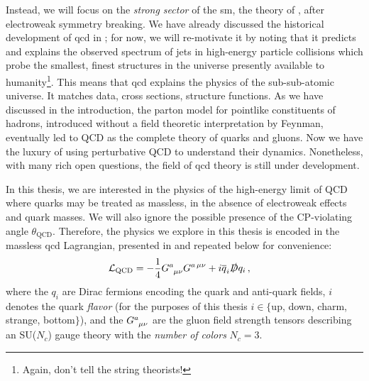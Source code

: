 Instead, we will focus on the \textit{strong sector} of the \gls{sm}, the theory of , after electroweak symmetry breaking.
%
We have already discussed the historical development of \gls{qcd} in ;
%
for now, we will re-motivate it by noting that it predicts and explains the observed spectrum of jets in high-energy particle collisions which probe the smallest, finest structures in the universe presently available to humanity\footnote{Again, don't tell the string theorists!}.
%
This means that \gls{qcd} explains the physics of the sub-sub-atomic universe.
%
It matches data, cross sections, structure functions.
%
As we have discussed in the introduction, the parton model for pointlike constituents of hadrons, introduced without a field theoretic interpretation by Feynman, eventually led to QCD as the complete theory of quarks and gluons.
%
Now we have the luxury of using perturbative QCD to understand their dynamics.
%
Nonetheless, with many rich open questions, the field of \gls{qcd} theory is still under development.

In this thesis, we are interested in the physics of the high-energy limit of QCD where quarks may be treated as massless, in the absence of electroweak effects and quark masses.
%
We will also ignore the possible presence of the CP-violating angle \(\theta_\text{QCD}\).
%
Therefore, the physics we explore in this thesis is encoded in the massless \gls{qcd} Lagrangian, presented in  and repeated below for convenience:
\begin{align}
    \mathcal{L}_\text{QCD}
    &=
    - \frac{1}{4} G\indices{^a_{\mu\nu}} G^{a\,\mu\nu}
    +
    i \overline{q}_i \slashed{D} q_i
    \,,
\end{align}
where the \(q_i\) are Dirac fermions encoding the quark and anti-quark fields, \(i\) denotes the quark \textit{flavor} (for the purposes of this thesis \(i \in \{\)up, down, charm, strange, bottom\(\}\)), and the \(G\indices{^a_{\mu\nu}}\) are the gluon field strength tensors describing an SU(\(N_c\)) gauge theory with the \textit{number of colors} \(N_c = 3\).



